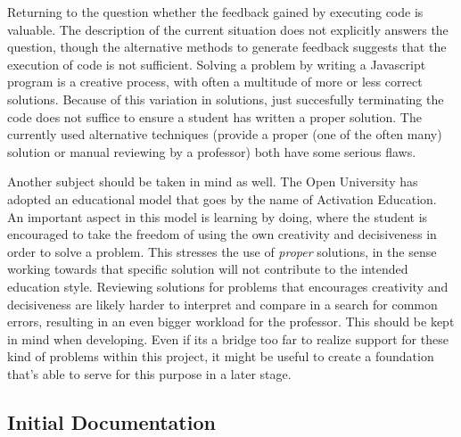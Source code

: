 \documentclass{article}
\begin{document}
Returning to the question whether the feedback gained by executing code is valuable. The description of the current situation does not explicitly answers the question, though the alternative methods to generate feedback suggests that the execution of code is not sufficient. Solving a problem by writing a Javascript program is a creative process, with often a multitude of more or less correct solutions. Because of this variation in solutions, just succesfully terminating the code does not suffice to ensure a student has written a proper solution. The currently used alternative techniques (provide a proper (one of the often many) solution or manual reviewing by a professor) both have some serious flaws. 

Another subject should be taken in mind as well. The Open University has adopted an educational model that goes by the name of Activation Education. An important aspect in this model is learning by doing, where the student is encouraged to take the freedom of using the own creativity and decisiveness in order to solve a problem. This stresses the use of {\em proper} solutions, in the sense working towards that specific solution will not contribute to the intended education style. Reviewing solutions for problems that encourages creativity and decisiveness are likely harder to interpret and compare in a search for common errors, resulting in an even bigger workload for the professor. This should be kept in mind when developing. Even if its a bridge too far to realize support for these kind of problems within this project, it might be useful to create a foundation that's able to serve for this purpose in a later stage.


\subsection{Initial Documentation}
\end{document}
